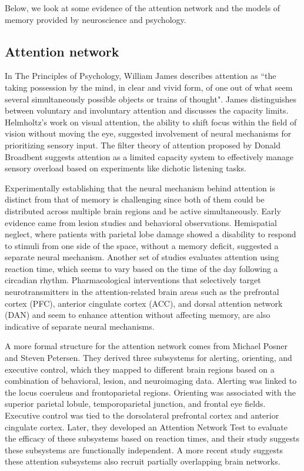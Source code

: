 \documentclass[reprint,amsmath,amssymb,apr,aip,onecolumn, 11pt]{revtex4-1}
\begin{document}
Below, we look at some evidence of the attention network and the models of memory provided by neuroscience and psychology. 

\subsection{Attention network}

In The Principles of Psychology, William James describes attention as ``the taking possession by the mind, in clear and vivid form, of one out of what seem several simultaneously possible objects or trains of thought"\cite{James_1890}. James distinguishes between voluntary and involuntary attention and discusses the capacity limits.  Helmholtz’s work on visual attention, the ability to shift focus within the field of vision without moving the eye, suggested involvement of neural mechanisms for prioritizing sensory input\cite{Helmholtz_1925,Carrasco_2011}. 
The filter theory of attention proposed by Donald Broadbent suggests attention as a limited capacity system to effectively manage sensory overload based on experiments like dichotic listening tasks\cite{Broadbent_1958}.

Experimentally establishing that the neural mechanism behind attention is distinct from that of memory is challenging since both of them could be distributed across multiple brain regions and be active simultaneously. Early evidence came from lesion studies and behavioral observations. Hemispatial neglect, where patients with parietal lobe damage showed a disability to respond to stimuli from one side of the space, without a memory deficit, suggested a separate neural mechanism\cite{HEILMAN1977, VALLAR1986}. Another set of studies evaluates attention using reaction time, which seems to vary based on the time of the day following a circadian rhythm\cite{Matchock2009, BLATTER2007}. Pharmacological interventions that selectively target neurotransmitters in the attention-related brain areas such as the prefrontal cortex (PFC), anterior cingulate cortex (ACC), and dorsal attention network (DAN) and seem to enhance attention without affecting memory, are also indicative of separate neural mechanisms\cite{SPENCER2000, Scahill2001}. 


A more formal structure for the attention network comes from Michael Posner and Steven Petersen. They derived three subsystems for alerting, orienting, and executive control, which they mapped to different brain regions based on a combination of behavioral, lesion, and neuroimaging data.  Alerting was linked to the locus coeruleus and frontoparietal regions. Orienting was associated with the superior parietal lobule, temporoparietal junction, and frontal eye fields. Executive control was tied to the dorsolateral prefrontal cortex and anterior cingulate cortex\cite{Posner_1990}. Later, they developed an Attention Network Test to evaluate the efficacy of these subsystems based on reaction times, and their study suggests these subsystems are functionally independent\cite{Fan_2002}. A more recent study suggests these attention subsystems also recruit partially overlapping brain networks\cite{Markett_2022}. 
\end{document}
